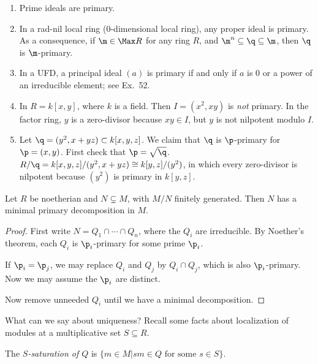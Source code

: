  \begin{example}
  \begin{enumerate}
   \item Prime ideals are primary.

   \item In a rad-nil local ring (0-dimensional local ring), any proper ideal is primary.
   As a consequence, if $\m\in \Max R$ for any ring $R$, and $\m^n\subseteq \q\subseteq
   \m$, then $\q$ is $\m$-primary.

   \item In a UFD, a principal ideal $(a)$ is primary if and only if $a$ is 0 or a power
   of an irreducible element; see Ex.\ 52.

   \item In $R=k[x,y]$, where $k$ is a field. Then $I=(x^2,xy)$ is \emph{not} primary. In
   the factor ring, $y$ is a zero-divisor because $xy\in I$, but $y$ is not nilpotent
   modulo $I$.

   \item Let $\q=(y^2,x+yz)\subset k[x,y,z]$. We claim that $\q$ is $\p$-primary for
   $\p=(x,y)$. First check that $\p=\sqrt \q$. $R/\q = k[x,y,z]/(y^2,x+yz)\cong
   k[y,z]/(y^2)$, in which every zero-divisor is nilpotent because $(y^2)$ is primary in
   $k[y,z]$.
  \end{enumerate}
  \vspace*{-1.7\baselineskip}
 \end{example}
 \begin{theorem}
   Let $R$ be noetherian and $N\subsetneq M$, with $M/N$ finitely generated. Then $N$ has
   a minimal primary decomposition in $M$.
 \end{theorem}
 \begin{proof}
   First write $N=Q_1\cap \cdots \cap Q_n$, where the $Q_i$ are irreducible. By Noether's
   theorem, each $Q_i$ is $\p_i$-primary for some prime $\p_i$.

   If $\p_i=\p_j$, we may replace $Q_i$ and $Q_j$ by $Q_i\cap Q_j$, which is also
   $\p_i$-primary. Now we may assume the $\p_i$ are distinct.

   Now remove unneeded $Q_i$ until we have a minimal decomposition.
 \end{proof}
 What can we say about uniqueness? Recall some facts about localization of modules at a
 multiplicative set $S\subseteq R$.
 \begin{definition}
   The \emph{$S$-saturation of $Q$} is $\{m\in M|sm\in Q\text{ for some }s\in S\}$.
 \end{definition}
